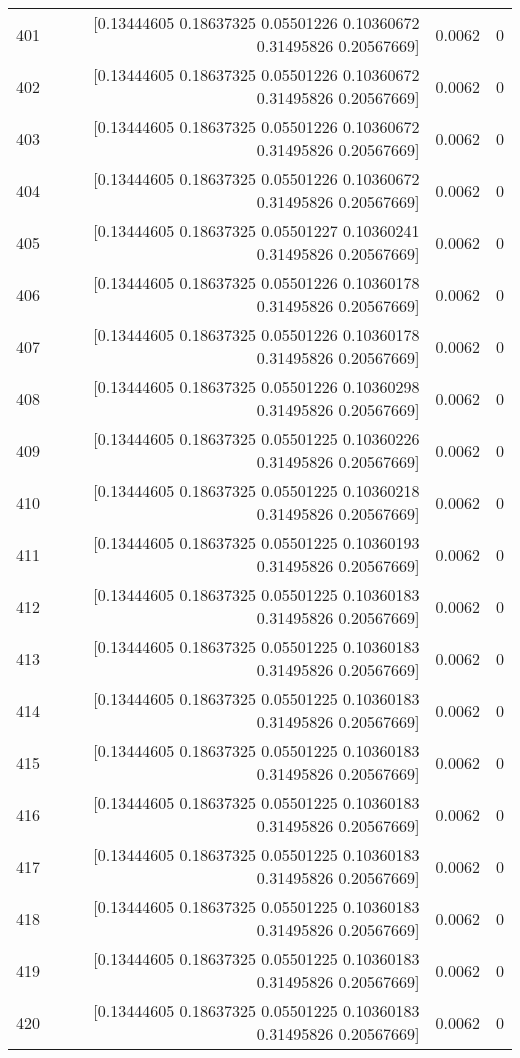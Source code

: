 \begin{longtable}{lrrr}
401 & [0.13444605 0.18637325 0.05501226 0.10360672 0.31495826 0.20567669] & 0.0062 & 0 \\
402 & [0.13444605 0.18637325 0.05501226 0.10360672 0.31495826 0.20567669] & 0.0062 & 0 \\
403 & [0.13444605 0.18637325 0.05501226 0.10360672 0.31495826 0.20567669] & 0.0062 & 0 \\
404 & [0.13444605 0.18637325 0.05501226 0.10360672 0.31495826 0.20567669] & 0.0062 & 0 \\
405 & [0.13444605 0.18637325 0.05501227 0.10360241 0.31495826 0.20567669] & 0.0062 & 0 \\
406 & [0.13444605 0.18637325 0.05501226 0.10360178 0.31495826 0.20567669] & 0.0062 & 0 \\
407 & [0.13444605 0.18637325 0.05501226 0.10360178 0.31495826 0.20567669] & 0.0062 & 0 \\
408 & [0.13444605 0.18637325 0.05501226 0.10360298 0.31495826 0.20567669] & 0.0062 & 0 \\
409 & [0.13444605 0.18637325 0.05501225 0.10360226 0.31495826 0.20567669] & 0.0062 & 0 \\
410 & [0.13444605 0.18637325 0.05501225 0.10360218 0.31495826 0.20567669] & 0.0062 & 0 \\
411 & [0.13444605 0.18637325 0.05501225 0.10360193 0.31495826 0.20567669] & 0.0062 & 0 \\
412 & [0.13444605 0.18637325 0.05501225 0.10360183 0.31495826 0.20567669] & 0.0062 & 0 \\
413 & [0.13444605 0.18637325 0.05501225 0.10360183 0.31495826 0.20567669] & 0.0062 & 0 \\
414 & [0.13444605 0.18637325 0.05501225 0.10360183 0.31495826 0.20567669] & 0.0062 & 0 \\
415 & [0.13444605 0.18637325 0.05501225 0.10360183 0.31495826 0.20567669] & 0.0062 & 0 \\
416 & [0.13444605 0.18637325 0.05501225 0.10360183 0.31495826 0.20567669] & 0.0062 & 0 \\
417 & [0.13444605 0.18637325 0.05501225 0.10360183 0.31495826 0.20567669] & 0.0062 & 0 \\
418 & [0.13444605 0.18637325 0.05501225 0.10360183 0.31495826 0.20567669] & 0.0062 & 0 \\
419 & [0.13444605 0.18637325 0.05501225 0.10360183 0.31495826 0.20567669] & 0.0062 & 0 \\
420 & [0.13444605 0.18637325 0.05501225 0.10360183 0.31495826 0.20567669] & 0.0062 & 0 \\

\end{longtable}
